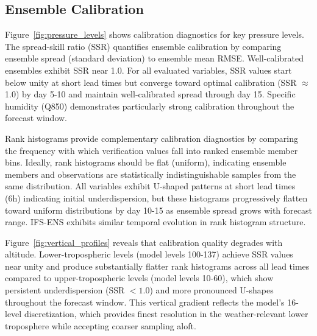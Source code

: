 \documentclass{agujournal2019}
\begin{document}
\subsection{Ensemble Calibration}

Figure~\ref{fig:pressure_levels} shows calibration diagnostics for key pressure levels. The spread-skill ratio (SSR) quantifies ensemble calibration by comparing ensemble spread (standard deviation) to ensemble mean RMSE. Well-calibrated ensembles exhibit SSR near 1.0. For all evaluated variables, SSR values start below unity at short lead times but converge toward optimal calibration (SSR $\approx$ 1.0) by day 5-10 and maintain well-calibrated spread through day 15. Specific humidity (Q850) demonstrates particularly strong calibration throughout the forecast window.

Rank histograms provide complementary calibration diagnostics by comparing the frequency with which verification values fall into ranked ensemble member bins. Ideally, rank histograms should be flat (uniform), indicating ensemble members and observations are statistically indistinguishable samples from the same distribution. All variables exhibit U-shaped patterns at short lead times (6h) indicating initial underdispersion, but these histograms progressively flatten toward uniform distributions by day 10-15 as ensemble spread grows with forecast range. IFS-ENS exhibits similar temporal evolution in rank histogram structure.

Figure~\ref{fig:vertical_profiles} reveals that calibration quality degrades with altitude. Lower-tropospheric levels (model levels 100-137) achieve SSR values near unity and produce substantially flatter rank histograms across all lead times compared to upper-tropospheric levels (model levels 10-60), which show persistent underdispersion (SSR $< 1.0$) and more pronounced U-shapes throughout the forecast window. This vertical gradient reflects the model's 16-level discretization, which provides finest resolution in the weather-relevant lower troposphere while accepting coarser sampling aloft.

\end{document}

